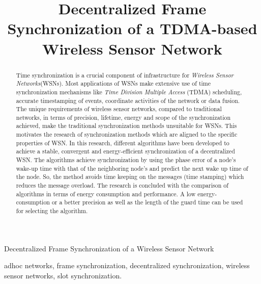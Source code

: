 \documentclass[journal]{IEEEtran}
\begin{document}
%
\title{Decentralized Frame Synchronization of a TDMA-based Wireless Sensor Network}

\author{\IEEEauthorblockN{}
}

{Decentralized Frame Synchronization of a Wireless Sensor Network}

\maketitle

\begin{abstract}
Time synchronization is a crucial component of infrastructure for
\textit{Wireless Sensor Networks}(WSNs). Most applications of WSNs
make extensive use of time synchronization mechanisms like
\emph{Time Division Multiple Access} (TDMA) scheduling, accurate
timestamping of events, coordinate activities of the network or data
fusion. The unique requirements of wireless sensor networks,
compared to traditional networks, in terms of precision, lifetime,
energy and scope of the synchronization achieved, make the
traditional synchronization methods unsuitable for WSNs. This
motivates the research of synchronization methods which are
aligned to the specific properties of WSN. In this research,
different algorithms have been developed to achieve a stable,
convergent and energy-efficient synchronization of a decentralized
WSN. The algorithms achieve synchronization by using the phase error
of a node's wake-up time with that of the neighboring node's and predict
the next wake up time of the node. So, the method avoids time keeping on the messages (time
stamping) which reduces the message overload. The research is concluded with the comparison of
algorithms in terms of energy consumption and performance. A low
energy-consumption or a better precision as well as the length of
the guard time can be used for selecting the algorithm.
\end{abstract}
\begin{IEEEkeywords}
adhoc networks, frame synchronization, decentralized synchronization, wireless sensor networks,
slot synchronization.
\end{IEEEkeywords}
\end{document}
